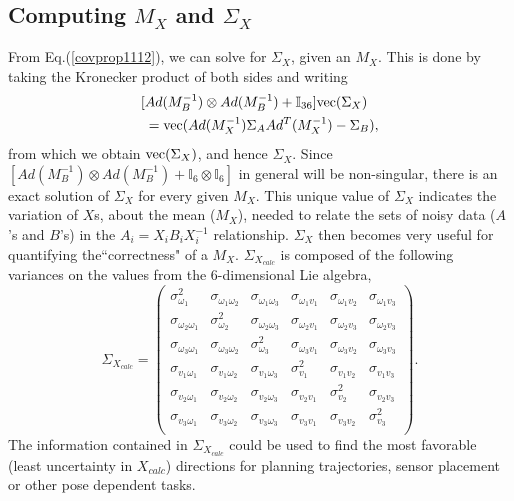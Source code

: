 \documentclass[twocolumn,10pt]{asme2ej}
\begin{document}
\subsection{Computing $M_X$ and $\Sigma_X$}
From Eq.(\ref{covprop1112}), we can solve for $\Sigma_X$, given an $M_X$. This is done by taking the Kronecker product of both sides and writing
\begin{equation}
\begin{split}
[&Ad(M_B^{-1}) \otimes Ad(M_B^{-1}) + \mathbb{I}_{36}] {\rm vec}(\Sigma_X)\\
&= {\rm vec}(Ad(M_X^{-1}) \Sigma_{A} Ad^T(M_X^{-1}) - \Sigma_{B}),
\end{split}
\label{kroncovprop1112} \end{equation}
from which we obtain ${\rm vec}(\Sigma_X)$, and hence $\Sigma_X$.
Since $[Ad(M_B^{-1}) \otimes Ad(M_B^{-1}) + \mathbb{I}_6 \otimes  \mathbb{I}_6]$ in general will be non-singular, there is an exact solution of $\Sigma_X$ for every given $M_X$. This unique value of $\Sigma_X$ indicates the variation of $X$s, about the mean ($M_X$), needed to relate the sets of noisy data ($A$'s and $B$'s) in the $A_i=X_iB_iX_i^{-1}$ relationship. $\Sigma_X$ then becomes very useful for quantifying the``correctness" of a $M_X$. $\Sigma_{X_{calc}}$ is composed of the following variances on the values from the 6-dimensional Lie algebra,
\begin{equation}
\Sigma_{X_{calc}}=\left(
\begin{array}{cccccc}
\sigma_{\omega_1}^2 & \sigma_{\omega_1\omega_2} & \sigma_{\omega_1\omega_3} & \sigma_{\omega_1v_1} & \sigma_{\omega_1v_2} & \sigma_{\omega_1v_3}\\
\sigma_{\omega_2\omega_1} & \sigma_{\omega_2}^2 &\sigma_{\omega_2\omega_3} & \sigma_{\omega_2v_1} & \sigma_{\omega_2v_3} & \sigma_{\omega_2v_3}\\
\sigma_{\omega_3\omega_1} & \sigma_{\omega_3\omega_2} & \sigma_{\omega_3}^2 & \sigma_{\omega_3v_1} & \sigma_{\omega_3v_2} & \sigma_{\omega_3v_3}\\
\sigma_{v_1\omega_1} & \sigma_{v_1\omega_2} & \sigma_{v_1\omega_3} & \sigma_{v_1}^2 & \sigma_{v_1v_2} & \sigma_{v_1v_3}\\
\sigma_{v_2 \omega_1} & \sigma_{v_2 \omega_2} & \sigma_{v_2 \omega_3} & \sigma_{v_2 v_1} & \sigma_{v_2}^2 & \sigma_{v_2 v_3}\\
\sigma_{v_3 \omega_1} & \sigma_{v_3\omega_2} & \sigma_{v_3\omega_3} & \sigma_{v_3 v_1} & \sigma_{v_3 v_2} & \sigma_{v_3}^2\\
\end{array}\right).
\end{equation}
The information contained in $\Sigma_{X_{calc}}$ could be used to find the most favorable (least uncertainty in $X_{calc}$) directions for planning trajectories, sensor placement or other pose dependent tasks.
\end{document}
